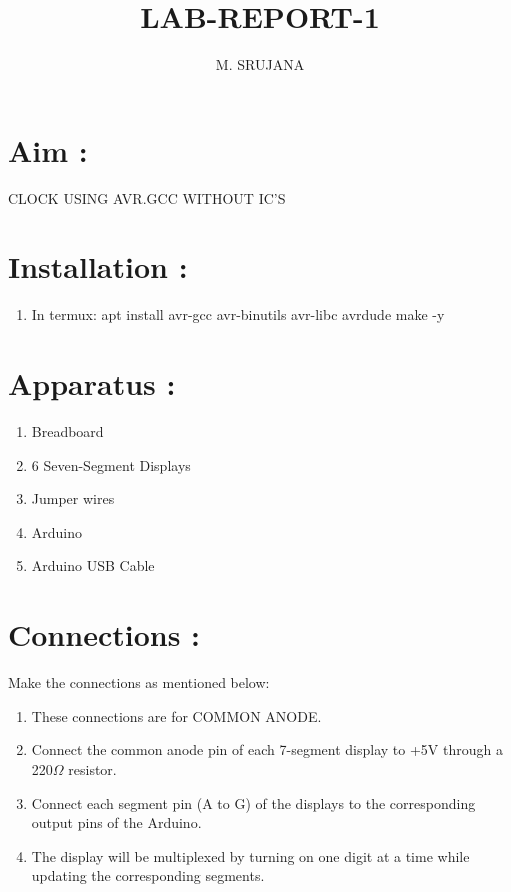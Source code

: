 \documentclass{article}
\title{\textbf{LAB-REPORT-1}}
\author{M. SRUJANA}
\begin{document}
\maketitle

\section{Aim :} CLOCK USING AVR.GCC WITHOUT IC'S

\section{Installation :}
\begin{enumerate}
    \item In termux: apt install avr-gcc avr-binutils avr-libc avrdude make -y
\end{enumerate}

\section{Apparatus :}
\begin{enumerate}
    \item Breadboard 
    \item 6 Seven-Segment Displays
    \item Jumper wires
    \item Arduino
    \item Arduino USB Cable 
\end{enumerate}

\section{Connections :}
Make the connections as mentioned below:
\begin{enumerate}
    \item These connections are for COMMON ANODE.
    \item Connect the common anode pin of each 7-segment display to +5V through a 220$\Omega$ resistor.
    \item Connect each segment pin (A to G) of the displays to the corresponding output pins of the Arduino.
    \item The display will be multiplexed by turning on one digit at a time while updating the corresponding segments.
\end{enumerate}



\end{document}
